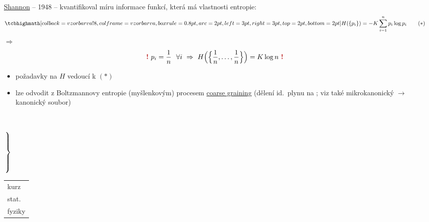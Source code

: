 \underline{Shannon} -- 1948 -- kvantifikoval míru informace funkcí, která má vlastnosti entropie:
\[
  \vzorec{H(\{p_i\}) = -K\sum_{i=1}^n p_i\log p_i} \qquad (*)
\]
$\Rightarrow$ 
\[
  \text{\pozor{!}}\ p_i = \frac1n\ \ \forall i \ \Rightarrow\ H\Big(\Big\{\frac1n,\dots,\frac1n\Big\}\Big) = K\log n \ \text{\pozor{!}}
\]

\begin{minipage}{0.75\textwidth}\color{NavyBlue}
\begin{itemize}
  \item požadavky na $H$ vedoucí k $(*)$
  \item lze odvodit z Boltzmannovy entropie (myšlenkovým) procesem \underline{coarse graining} (dělení id.\ plynu na ; viz také mikrokanonický $\to$ kanonický soubor)
\end{itemize}
\end{minipage}
\ \textcolor{NavyBlue}{$\left.\rule{0pt}{12mm}\right\}$ \begin{tabular}{l}kurz\\ stat.\\ fyziky\end{tabular}}

